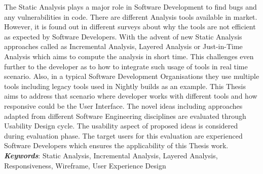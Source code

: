 The Static Analysis plays a major role in Software Development to find bugs and any vulnerabilities in code. There are different Analysis tools available in market. However, it is found out in different surveys about why the tools are not efficient as expected by Software Developers. With the advent of new Static Analysis approaches called as Incremental Analysis, Layered Analysis or Just-in-Time Analysis which aims to compute the analysis in short time. This challenges even further to the developer as to how to integrate such usage of tools in real time scenario. Also, in a typical Software Development Organisations they use multiple tools including legacy tools used in Nightly builds as an example. This Thesis aims to address that scenario where developer works with different tools and how responsive could be the User Interface. The novel ideas including approaches adapted from different Software Engineering disciplines are evaluated through Usability Design cycle. The usability aspect of proposed ideas is considered during evaluation phase. The target users for this evaluation are experienced Software Developers which ensures the applicability of this Thesis work. \\
\textbf{\textit{Keywords}}: Static Analysis, Incremental Analysis, Layered Analysis, Responsiveness, Wireframe, User Experience Design
